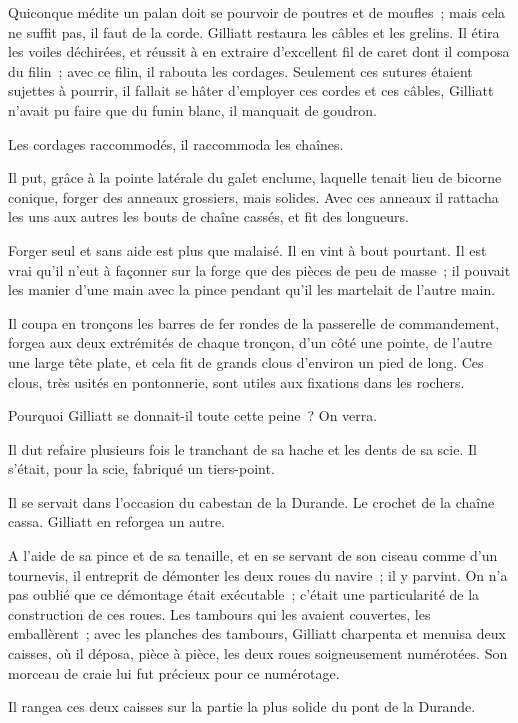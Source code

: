 \documentclass[french,twoside]{book} %
\begin{document}
Quiconque médite un palan doit se pourvoir de  poutres et de moufles ; mais cela ne suffit pas, il faut de la corde. Gilliatt restaura les câbles et les grelins. Il étira les voiles déchirées, et réussit à en extraire d’excellent fil de caret dont il composa du filin ; avec ce filin, il rabouta les cordages. Seulement ces sutures étaient sujettes à pourrir, il fallait se hâter d’employer ces cordes et ces câbles, Gilliatt n’avait pu faire que du funin blanc, il manquait de goudron.\par
Les cordages raccommodés, il raccommoda les chaînes.\par
Il put, grâce à la pointe latérale du galet enclume, laquelle tenait lieu de bicorne conique, forger des anneaux grossiers, mais solides. Avec ces anneaux il rattacha les uns aux autres les bouts de chaîne cassés, et fit des longueurs.\par
Forger seul et sans aide est plus que malaisé. Il en vint à bout pourtant. Il est vrai qu’il n’eut à façonner sur la forge que des pièces de peu de masse ; il pouvait les manier d’une main avec la pince pendant qu’il les martelait de l’autre main.\par
Il coupa en tronçons les barres de fer rondes de la passerelle de commandement, forgea aux deux extrémités de chaque tronçon, d’un côté une pointe, de l’autre une large tête plate, et cela fit de grands clous d’environ un pied de long. Ces clous, très usités en pontonnerie, sont utiles aux fixations dans les rochers.\par
Pourquoi Gilliatt se donnait-il toute cette peine ? On verra.\par
Il dut refaire plusieurs fois le tranchant de sa hache  et les dents de sa scie. Il s’était, pour la scie, fabriqué un tiers-point.\par
Il se servait dans l’occasion du cabestan de la Durande. Le crochet de la chaîne cassa. Gilliatt en reforgea un autre.\par
A l’aide de sa pince et de sa tenaille, et en se servant de son ciseau comme d’un tournevis, il entreprit de démonter les deux roues du navire ; il y parvint. On n’a pas oublié que ce démontage était exécutable ; c’était une particularité de la construction de ces roues. Les tambours qui les avaient couvertes, les emballèrent ; avec les planches des tambours, Gilliatt charpenta et menuisa deux caisses, où il déposa, pièce à pièce, les deux roues soigneusement numérotées. Son morceau de craie lui fut précieux pour ce numérotage.\par
Il rangea ces deux caisses sur la partie la plus solide du pont de la Durande.\par
\end{document}
